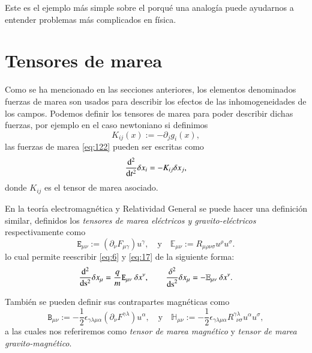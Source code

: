 Este es el ejemplo más simple sobre el porqué una analogía puede ayudarnos a entender problemas más complicados en física.

\section{Tensores de marea}
Como se ha mencionado en las secciones anteriores, los elementos denominados fuerzas de marea son usados para describir los efectos de las inhomogeneidades de los campos. Podemos definir los tensores de marea para poder describir dichas fuerzas, por ejemplo en el caso newtoniano si definimos
\begin{equation}
K_{ij} (x) := - \partial_j g_i(x),
\end{equation}
las fuerzas de marea \eqref{eq:122} pueden ser escritas como
\begin{equation}
\dv[2]{ }{t}\delta x_i = -K_{ij}\delta x_j,
\end{equation}
donde $K_{ij}$ es el tensor de marea asociado.

En la teoría electromagnética y Relatividad General se puede hacer una definición similar, definidos los \textit{tensores de marea eléctricos y gravito-eléctricos} respectivamente como
\begin{equation}
\label{eq:50}
\mathtt{E}_{\mu \nu} := \left( \partial_{\nu} F_{\mu \gamma} \right) u^{\gamma}, \quad 
\mathrm{y } \quad \mathbb{E}_{\mu \nu} := R_{\mu \rho \nu \sigma} u^{\rho} u^{\sigma}.
\end{equation}
lo cual permite reescribir \eqref{eq:6} y \eqref{eq:17} de la siguiente forma:
\begin{equation}
\label{eq:130}
\dv[2]{ }{\s} \delta x_{\mu} = \frac{q}{m} \mathtt{E}_{\mu \nu} \ \delta x^{\nu}
,\qquad
\frac{\delta^2}{\mathrm{ds}^2} \delta x_{\mu} = - \mathbb{E}_{\mu \nu} \ \delta x^{\nu}.
\end{equation}

También se pueden definir sus contrapartes magnéticas como
\begin{equation}
\label{eq:51}
\mathtt{B}_{\mu \nu} := -\frac{1}{2} \epsilon_{\gamma \lambda \mu \alpha} \left( \partial_{\nu} F^{\gamma \lambda} \right) u^{\alpha}
,\quad \mathrm{y} \quad
\mathbb{H}_{\mu \nu} := -\frac{1}{2} \epsilon_{\gamma \lambda \mu \alpha} R^{\gamma \lambda}_{\ \ \nu \sigma} u^{\alpha} u^{\sigma},
\end{equation}
a las cuales nos referiremos como \textit{tensor de marea magnético} y \textit{tensor de marea gravito-magnético}.

